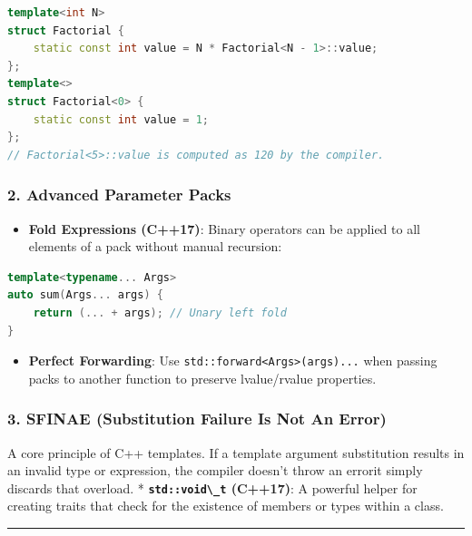 \begin{lstlisting}[language={C++}]
template<int N>
struct Factorial {
    static const int value = N * Factorial<N - 1>::value;
};
template<>
struct Factorial<0> {
    static const int value = 1;
};
// Factorial<5>::value is computed as 120 by the compiler.
\end{lstlisting}

\hypertarget{advanced-parameter-packs}{%
\subsubsection{2. Advanced Parameter
Packs}\label{advanced-parameter-packs}}

\begin{itemize}
\tightlist
\item
  \textbf{Fold Expressions (C++17)}: Binary operators can be applied to
  all elements of a pack without manual recursion:
\end{itemize}

\begin{lstlisting}[language={C++}]
template<typename... Args>
auto sum(Args... args) {
    return (... + args); // Unary left fold
}
\end{lstlisting}

\begin{itemize}
\tightlist
\item
  \textbf{Perfect Forwarding}: Use
  \passthrough{\lstinline!std::forward<Args>(args)...!} when passing
  packs to another function to preserve lvalue/rvalue properties.
\end{itemize}

\hypertarget{sfinae-substitution-failure-is-not-an-error}{%
\subsubsection{3. SFINAE (Substitution Failure Is Not An
Error)}\label{sfinae-substitution-failure-is-not-an-error}}

A core principle of C++ templates. If a template argument substitution
results in an invalid type or expression, the compiler doesn't throw an
errorit simply discards that overload. *
\textbf{\passthrough{\lstinline!std::void\_t!} (C++17)}: A powerful
helper for creating traits that check for the existence of members or
types within a class.

\begin{center}\rule{0.5\linewidth}{0.5pt}\end{center}

